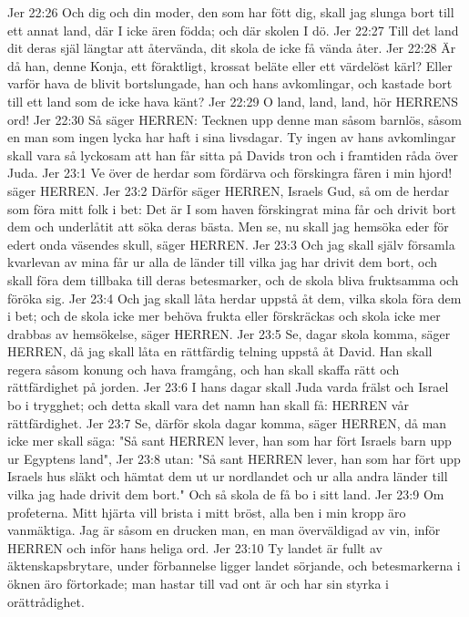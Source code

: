 Jer 22:26  Och dig och din moder, den som har fött dig, skall jag slunga bort till ett annat land, där I icke ären födda; och där skolen I dö.
Jer 22:27  Till det land dit deras själ längtar att återvända, dit skola de icke få vända åter.
Jer 22:28  Är då han, denne Konja, ett föraktligt, krossat beläte eller ett värdelöst kärl? Eller varför hava de blivit bortslungade, han och hans avkomlingar, och kastade bort till ett land som de icke hava känt?
Jer 22:29  O land, land, land, hör HERRENS ord!
Jer 22:30  Så säger HERREN: Tecknen upp denne man såsom barnlös, såsom en man som ingen lycka har haft i sina livsdagar. Ty ingen av hans avkomlingar skall vara så lyckosam att han får sitta på Davids tron och i framtiden råda över Juda.
Jer 23:1  Ve över de herdar som fördärva och förskingra fåren i min hjord! säger HERREN.
Jer 23:2  Därför säger HERREN, Israels Gud, så om de herdar som föra mitt folk i bet: Det är I som haven förskingrat mina får och drivit bort dem och underlåtit att söka deras bästa. Men se, nu skall jag hemsöka eder för edert onda väsendes skull, säger HERREN.
Jer 23:3  Och jag skall själv församla kvarlevan av mina får ur alla de länder till vilka jag har drivit dem bort, och skall föra dem tillbaka till deras betesmarker, och de skola bliva fruktsamma och föröka sig.
Jer 23:4  Och jag skall låta herdar uppstå åt dem, vilka skola föra dem i bet; och de skola icke mer behöva frukta eller förskräckas och skola icke mer drabbas av hemsökelse, säger HERREN.
Jer 23:5  Se, dagar skola komma, säger HERREN, då jag skall låta en rättfärdig telning uppstå åt David. Han skall regera såsom konung och hava framgång, och han skall skaffa rätt och rättfärdighet på jorden.
Jer 23:6  I hans dagar skall Juda varda frälst och Israel bo i trygghet; och detta skall vara det namn han skall få: HERREN vår rättfärdighet.
Jer 23:7  Se, därför skola dagar komma, säger HERREN, då man icke mer skall säga: "Så sant HERREN lever, han som har fört Israels barn upp ur Egyptens land",
Jer 23:8  utan: "Så sant HERREN lever, han som har fört upp Israels hus släkt och hämtat dem ut ur nordlandet och ur alla andra länder till vilka jag hade drivit dem bort." Och så skola de få bo i sitt land.
Jer 23:9  Om profeterna. Mitt hjärta vill brista i mitt bröst, alla ben i min kropp äro vanmäktiga. Jag är såsom en drucken man, en man överväldigad av vin, inför HERREN och inför hans heliga ord.
Jer 23:10  Ty landet är fullt av äktenskapsbrytare, under förbannelse ligger landet sörjande, och betesmarkerna i öknen äro förtorkade; man hastar till vad ont är och har sin styrka i orättrådighet.
